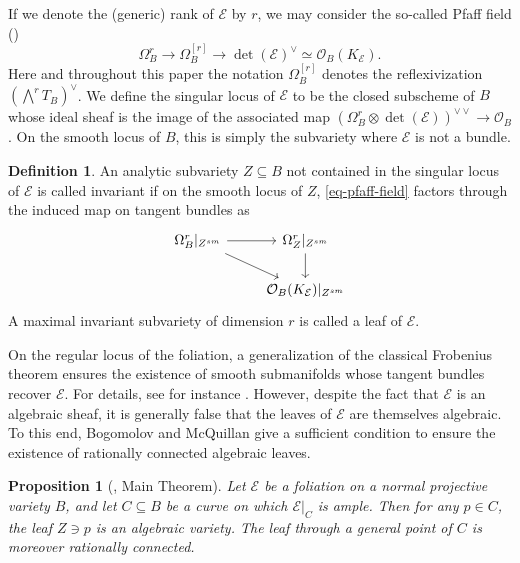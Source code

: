 \documentclass[12pt]{amsart}
\newtheorem{proposition}[theorem]{Proposition}
\theoremstyle{definition}
\newtheorem{definition}[theorem]{Definition}
\theoremstyle{remark}
\numberwithin{equation}{section}
\begin{document}
If we denote the (generic) rank of \(\mathcal{E}\) by \(r\), we may consider
the so-called Pfaff field  (\cite[Definition 2.2]{araujo18})
\begin{equation} \label{eq-pfaff-field}
    \Omega_B^r \to \Omega_B^{[r]} \to \det(\mathcal{E})^\vee \simeq 
    \mathcal{O}_B(K_{\mathcal{E}}).
\end{equation}
Here and throughout this paper the notation \(\Omega_B^{[r]}\) denotes the
reflexivization \(\left(\bigwedge^r T_B\right)^\vee\). We define the singular locus 
of \(\mathcal{E}\) to be the closed subscheme of \(B\) whose ideal sheaf is the image
of the associated map \(\left(\Omega_B^r \otimes \det(\mathcal{E})\right)^{\vee \vee}
\to \mathcal{O}_B\). On the smooth locus of \(B\), this is simply the subvariety
where \(\mathcal{E}\) is not a bundle.

\begin{definition}
    An analytic subvariety \(Z \subseteq B\) not contained in the singular locus of 
    \(\mathcal{E}\) is called invariant if on the smooth locus of \(Z\), 
    \eqref{eq-pfaff-field} factors through the induced map on tangent bundles as
\begin{equation*}
    \begin{tikzcd}
    \Omega_B^r|_{Z^{sm}} \arrow{r} \arrow{rd} & \Omega_Z^r|_{Z^{sm}} \arrow{d} \\
    & \mathcal{O}_B(K_\mathcal{E})|_{Z^{sm}}
    \end{tikzcd}
\end{equation*}
A maximal invariant subvariety of dimension \(r\) is called a leaf of \(\mathcal{E}\).
\end{definition}

On the regular locus of the foliation, a generalization
of the classical Frobenius theorem ensures the existence of smooth submanifolds
whose tangent bundles recover \(\mathcal{E}\). For details, see for instance 
\cite[Proposition 1.3.3]{bog-mcq16}. However, despite the fact that \(\mathcal{E}\)
is an algebraic sheaf, it is generally false that the leaves of \(\mathcal{E}\)
are themselves algebraic. To this end, Bogomolov and McQuillan give a sufficient
condition to ensure the existence of rationally connected algebraic leaves. 



\begin{proposition}[\cite{bog-mcq16}, Main Theorem] \label{bog-mcq-main-theorem}
    Let $\mathcal{E}$ be a foliation on a normal projective variety $B$,
    and let $C \subseteq B$ be a curve on which $\mathcal{E}|_C$ is ample. Then for
    any $p \in C$, the leaf $Z \ni p$ is an algebraic variety. The leaf through 
    a general point of \(C\) is moreover rationally connected.
\end{proposition}
\end{document}
